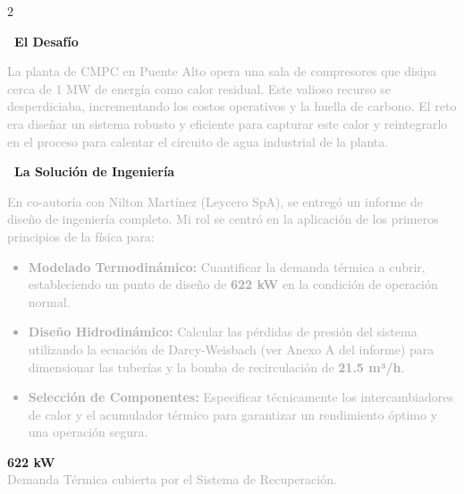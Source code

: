 \documentclass[10pt, a4paper]{article}
\newcommand{\sectiontitle}[1]{\par\vspace{4mm}\noindent\textcolor{DeepBlue}{\large\textbf{#1}}\par\vspace{1mm}}
\begin{document}
\begin{sloppy}

\begin{multicols}{2}


\sectiontitle{\faExclamationTriangle\ El Desafío}
\textcolor{DarkGray}{
La planta de CMPC en Puente Alto opera una sala de compresores que disipa cerca de 1 MW de energía como calor residual. Este valioso recurso se desperdiciaba, incrementando los costos operativos y la huella de carbono. El reto era diseñar un sistema robusto y eficiente para capturar este calor y reintegrarlo en el proceso para calentar el circuito de agua industrial de la planta.
}

\sectiontitle{\faCogs\ La Solución de Ingeniería}
\textcolor{DarkGray}{
En co-autoría con Nilton Martínez (Leycero SpA), se entregó un informe de diseño de ingeniería completo. Mi rol se centró en la aplicación de los primeros principios de la física para:
\begin{itemize}
    \item \textbf{Modelado Termodinámico:} Cuantificar la demanda térmica a cubrir, estableciendo un punto de diseño de \textbf{622 kW} en la condición de operación normal.
    \item \textbf{Diseño Hidrodinámico:} Calcular las pérdidas de presión del sistema utilizando la ecuación de Darcy-Weisbach (ver Anexo A del informe) para dimensionar las tuberías y la bomba de recirculación de \textbf{21.5 m³/h}.
    \item \textbf{Selección de Componentes:} Especificar técnicamente los intercambiadores de calor y el acumulador térmico para garantizar un rendimiento óptimo y una operación segura.
\end{itemize}
}


\begin{tcolorbox}[
    colback=LightGray,
    colframe=OrangeAccent,
    boxrule=1pt,
    title=\textcolor{DeepBlue}{\large\textbf{\faChartLine\ Parámetros de Diseño Clave}}
]
    \Large\textbf{622 kW} \\
    \textcolor{DarkGray}{Demanda Térmica cubierta por el Sistema de Recuperación.}
    \vspace{4mm}
    

\end{tcolorbox}
\end{multicols}
\end{sloppy}
\end{document}
